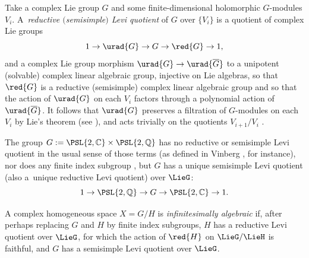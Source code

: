 \documentclass[10pt,a4paper]{amsart}
\providecommand{\C}{}
\numberwithin{equation}{section}
\renewcommand{\C}{\mathbb{C}}
\newcommand{\Q}{\mathbb{Q}}
\begin{document}
Take a complex Lie group $G$ and some finite-dimensional holomorphic $G$-modules $V_i$.
A~\emph{reductive $($semisimple$)$ Levi quotient} of $G$ over $\{V_i\}$ is a quotient of complex Lie groups
\[
1 \to \urad{G} \to G \to \red{G} \to 1,
\]
and a complex Lie group morphism $\urad{G} \to \urad{\overline{G}}$ to a unipotent (solvable) complex
linear algebraic group, injective on Lie algebras, so that $\red{G}$ is a reductive (semisimple) complex
linear algebraic group and so that the action of $\urad{G}$ on each $V_i$ factors through a polynomial
action of $\urad{\overline{G}}$.
It follows that $\urad{G}$ preserves a filtration of $G$-modules on each $V_i$ by Lie's theorem
(see \cite[Theorem~3]{Serre:2001}), and acts trivially on the quotients $V_{i+1}/V_i$
\cite[Section 4.8]{Borel:1991}.
\begin{Example}

The group $G := \PSL{2,\C} \times \PSL{2,\Q{}}$ has no reductive or semisimple Levi quotient in the
usual sense of those terms (as defined in Vinberg \cite[p.~20]{Vinberg:1994}, for instance), nor does any finite index
subgroup \cite[Theorem 6.14]{Jacobson:1985}, but $G$ has a unique semisimple Levi quotient (also a~unique reductive Levi quotient) over $\LieG$:
\[
1 \to \PSL{2,\Q{}} \to G \to \PSL{2,\C} \to 1.
\]
\end{Example}
A complex homogeneous space $X=G/H$ is \emph{infinitesimally algebraic} if, after perhaps replacing $G$ and $H$ by finite index subgroups, $H$ has a reductive Levi quotient over $\LieG$, for which the action of $\red{H}$ on $\LieG/\LieH$ is faithful, and $G$ has a semisimple Levi quotient over $\LieG$.
\end{document}
